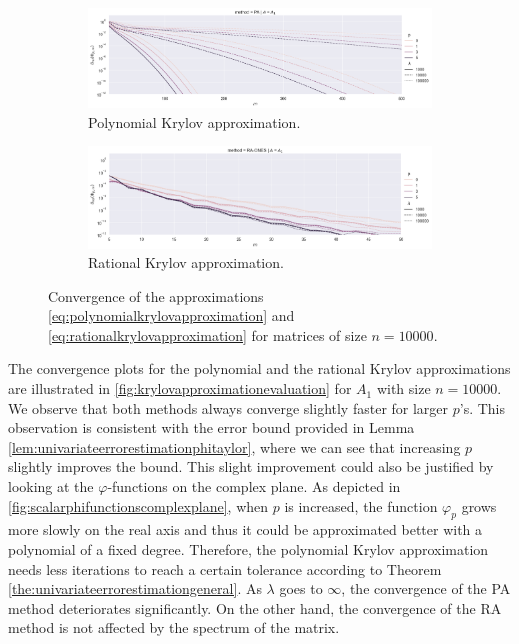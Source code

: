 \begin{figure}[h!]
    \centering
    \begin{subfigure}[b]{.9\textwidth}
        \includegraphics[width=\textwidth]{img/krylovapproximation/cnvg_ps_PA_n10000.png}
        \caption{Polynomial Krylov approximation.}
        \label{fig:polynomialkrylovapproximationevaluation}
    \end{subfigure}
    \vfill
    \begin{subfigure}[b]{.9\textwidth}
        \includegraphics[width=\textwidth]{img/krylovapproximation/cnvg_ps_RA_n10000.png}
        \caption{Rational Krylov approximation.}
        \label{fig:rationalkrylovapproximationevaluation}
    \end{subfigure}
    \caption{
        Convergence of the approximations \eqref{eq:polynomialkrylovapproximation}
        and \eqref{eq:rationalkrylovapproximation} for matrices of size $n=10000$.
    }
    \label{fig:krylovapproximationevaluation}
\end{figure}

The convergence plots for the polynomial and the rational Krylov approximations are
illustrated in \autoref{fig:krylovapproximationevaluation} for $A_1$ with size $n=10000$.
We observe that both methods always converge slightly faster for larger $p$'s.
This observation is consistent with the error bound provided in Lemma
\ref{lem:univariateerrorestimationphitaylor}, where we can see that increasing $p$ slightly
improves the bound. This slight improvement could also be justified by looking at the
$\varphi$-functions on the complex plane. As depicted in
\autoref{fig:scalarphifunctionscomplexplane}, when $p$ is increased, the
function $\varphi_p$ grows more slowly on the real axis and thus it could be approximated
better with a polynomial of a fixed degree. Therefore, the polynomial Krylov approximation needs
less iterations to reach a certain tolerance according to Theorem
\ref{the:univariateerrorestimationgeneral}.
As $\lambda$ goes to $\infty$, the convergence of the PA method deteriorates significantly.
On the other hand, the convergence of the RA method is not affected by the spectrum
of the matrix.


